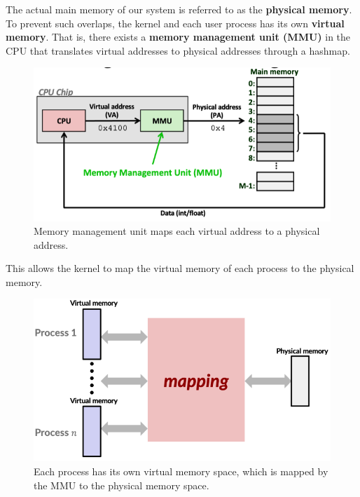 \documentclass{article}
\begin{document}
    \begin{definition}
      The actual main memory of our system is referred to as the \textbf{physical memory}. To prevent such overlaps, the kernel and each user process has its own \textbf{virtual memory}. That is, there exists a \textbf{memory management unit (MMU)} in the CPU that translates virtual addresses to physical addresses through a hashmap. 
      \begin{figure}[H]
        \centering 
        \includegraphics[scale=0.4]{img/mmu.png}
        \caption{Memory management unit maps each virtual address to a physical address.} 
        \label{fig:mmu}
      \end{figure}
      This allows the kernel to map the virtual memory of each process to the physical memory.
      \begin{figure}[H]
        \centering 
        \includegraphics[scale=0.4]{img/vm_map.png}
        \caption{Each process has its own virtual memory space, which is mapped by the MMU to the physical memory space. } 
        \label{fig:vm_map}
      \end{figure}
    \end{definition}
\end{document}
